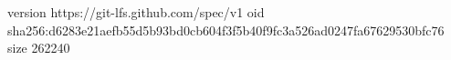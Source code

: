 version https://git-lfs.github.com/spec/v1
oid sha256:d6283e21aefb55d5b93bd0cb604f3f5b40f9fc3a526ad0247fa67629530bfc76
size 262240
